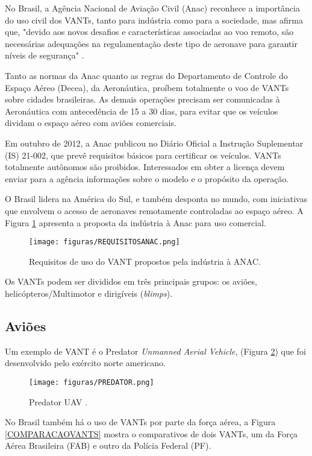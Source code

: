 No Brasil, a Agência Nacional de Aviação Civil (Anac) reconhece a importância do uso civil dos VANTs, tanto para indústria como para a sociedade, mas afirma que, "devido aos novos desafios e características associadas ao voo remoto, são necessárias adequações na regulamentação deste tipo de aeronave para garantir níveis de segurança" \cite{PolemicosRevolucionarios}.

Tanto as normas da Anac quanto as regras do Departamento de Controle do Espaço Aéreo (Decea), da Aeronáutica, proíbem totalmente o voo de VANTs sobre cidades brasileiras. As demais operações precisam ser comunicadas à Aeronáutica com antecedência de 15 a 30 dias, para evitar que os veículos dividam o espaço aéreo com aviões comerciais.

Em outubro de 2012, a Anac publicou no Diário Oficial a Instrução Suplementar (IS) 21-002, que prevê requisitos básicos para certificar os veículos. VANTs totalmente autônomos são proibidos. Interessados em obter a licença devem enviar para a agência informações sobre o modelo e o propósito da operação.

O Brasil lidera na América do Sul, e também desponta no mundo, com iniciativas que envolvem o acesso de aeronaves remotamente controladas ao espaço aéreo. A Figura \ref{REQUISITOSANAC} apresenta a proposta da indústria à Anac para uso comercial.

\begin{figure}
	\centering
	\texttt{[image: figuras/REQUISITOSANAC.png]}
    \caption{Requisitos de uso do VANT propostos pela indústria à ANAC.}
    \label{REQUISITOSANAC}
\end{figure}

Os VANTs podem ser divididos em três principais grupos: os aviões, helicópteros/Multimotor e dirigíveis (\textit{blimps}). 

\subsection{Aviões}
Um exemplo de VANT é o Predator \textit{Unmanned Aerial Vehicle}, (Figura \ref{PREDATOR}) que foi desenvolvido pelo exército norte americano.

\begin{figure}
	\centering
	\texttt{[image: figuras/PREDATOR.png]}
    \caption{Predator UAV \cite{FMurtagh}.}
    \label{PREDATOR}
\end{figure}

No Brasil também há o uso de VANTs por parte da força aérea, a Figura \ref{COMPARACAOVANTS} mostra o comparativos de dois VANTs, um da Força Aérea Brasileira (FAB) e outro da Polícia Federal (PF).

